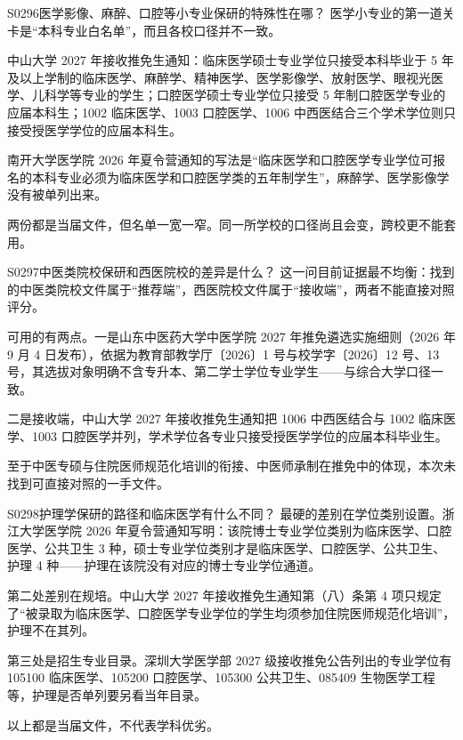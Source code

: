 \begin{qa}{S0296}{医学影像、麻醉、口腔等小专业保研的特殊性在哪？}
医学小专业的第一道关卡是“本科专业白名单”，而且各校口径并不一致。

中山大学 2027 年接收推免生通知：临床医学硕士专业学位只接受本科毕业于 5 年及以上学制的临床医学、麻醉学、精神医学、医学影像学、放射医学、眼视光医学、儿科学等专业的学生；口腔医学硕士专业学位只接受 5 年制口腔医学专业的应届本科生；1002 临床医学、1003 口腔医学、1006 中西医结合三个学术学位则只接受授医学学位的应届本科生。

南开大学医学院 2026 年夏令营通知的写法是“临床医学和口腔医学专业学位可报名的本科专业必须为临床医学和口腔医学类的五年制学生”，麻醉学、医学影像学没有被单列出来。

两份都是当届文件，但名单一宽一窄。同一所学校的口径尚且会变，跨校更不能套用。
\end{qa}

\begin{qa}{S0297}{中医类院校保研和西医院校的差异是什么？}
这一问目前证据最不均衡：找到的中医类院校文件属于“推荐端”，西医院校文件属于“接收端”，两者不能直接对照评分。

可用的有两点。一是山东中医药大学中医学院 2027 年推免遴选实施细则（2026 年 9 月 4 日发布），依据为教育部教学厅〔2026〕1 号与校学字〔2026〕12 号、13 号，其选拔对象明确不含专升本、第二学士学位专业学生——与综合大学口径一致。

二是接收端，中山大学 2027 年接收推免生通知把 1006 中西医结合与 1002 临床医学、1003 口腔医学并列，学术学位各专业只接受授医学学位的应届本科毕业生。

至于中医专硕与住院医师规范化培训的衔接、中医师承制在推免中的体现，本次未找到可直接对照的一手文件。
\end{qa}

\begin{qa}{S0298}{护理学保研的路径和临床医学有什么不同？}
最硬的差别在学位类别设置。浙江大学医学院 2026 年夏令营通知写明：该院博士专业学位类别为临床医学、口腔医学、公共卫生 3 种，硕士专业学位类别才是临床医学、口腔医学、公共卫生、护理 4 种——护理在该院没有对应的博士专业学位通道。

第二处差别在规培。中山大学 2027 年接收推免生通知第（八）条第 4 项只规定了“被录取为临床医学、口腔医学专业学位的学生均须参加住院医师规范化培训”，护理不在其列。

第三处是招生专业目录。深圳大学医学部 2027 级接收推免公告列出的专业学位有 105100 临床医学、105200 口腔医学、105300 公共卫生、085409 生物医学工程等，护理是否单列要另看当年目录。

以上都是当届文件，不代表学科优劣。
\end{qa}

